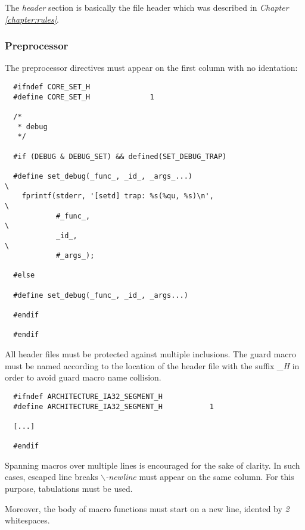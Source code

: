The \textit{header} section is basically the file header which was described
in \textit{Chapter \ref{chapter:rules}}.


\subsubsection{Preprocessor}

The preprocessor directives must appear on the first column with no
identation:

\begin{verbatim}
  #ifndef CORE_SET_H
  #define CORE_SET_H              1

  /*
   * debug
   */

  #if (DEBUG & DEBUG_SET) && defined(SET_DEBUG_TRAP)

  #define set_debug(_func_, _id_, _args_...)                              \
    fprintf(stderr, '[setd] trap: %s(%qu, %s)\n',                         \
            #_func_,                                                      \
            _id_,                                                         \
            #_args_);

  #else

  #define set_debug(_func_, _id_, _args...)

  #endif

  #endif
\end{verbatim}

All header files must be protected against multiple inclusions. The
guard macro must be named according to the location of the header file
with the suffix \textit{\_H} in order to avoid guard macro name collision.

\begin{verbatim}
  #ifndef ARCHITECTURE_IA32_SEGMENT_H
  #define ARCHITECTURE_IA32_SEGMENT_H           1

  [...]

  #endif
\end{verbatim}

Spanning macros over multiple lines is encouraged for the sake of clarity. In
such cases, escaped line breaks \textit{$\backslash$-newline} must appear
on the same column. For this purpose, tabulations must be used.

Moreover, the body of macro functions must start on a new line, idented by
\textit{2} whitespaces.

